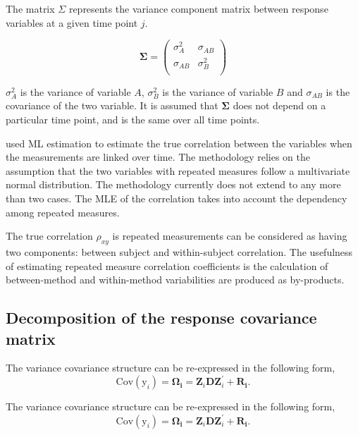 \documentclass[12pt, a4paper]{report}
\theoremstyle{plain}
\theoremstyle{definition}
\theoremstyle{remark}
\begin{document}
The matrix $\Sigma$ represents the variance component matrix between response variables at a given time point $j$.

\[
\boldsymbol{\Sigma} = \left( \begin{array}{cc}
\sigma^2_{A} & \sigma_{AB} \\
\sigma_{AB} & \sigma^2_{B}\\
\end{array}   \right)
\]

$\sigma^2_{A}$ is the variance of variable $A$, $\sigma^2_{B}$ is the variance of variable $B$ and $\sigma_{AB}$ is the covariance of the two variable. It is assumed that $\boldsymbol{\Sigma}$ does not depend on a particular time point, and is the same over all time points.

\citet{Lam} used ML estimation to estimate the true correlation between the variables when
the measurements are linked over time. The methodology relies on the assumption that the two variables with repeated measures follow a multivariate normal distribution. The methodology currently does not extend to any more than two cases. The MLE of the correlation takes into account the dependency among repeated measures.

The true correlation $\rho_{xy}$ is repeated measurements can be considered as having two components: between subject and within-subject correlation. The usefulness of estimating repeated measure correlation coefficients is the calculation of between-method and within-method variabilities are produced as by-products.


\newpage

\subsection{Decomposition of the response covariance matrix}
The variance covariance structure can be re-expressed in the following form,
\[
\mbox{Cov}(\mbox{y}_{i}) = \boldsymbol{\Omega_{i}} = \boldsymbol{Z}_{i}\boldsymbol{D}\boldsymbol{Z}_{i}^\prime + \boldsymbol{R_{i}}.
\]


The variance covariance structure can be re-expressed in the following form,
\[
\mbox{Cov}(\mbox{y}_{i}) = \boldsymbol{\Omega_{i}} = \boldsymbol{Z}_{i}\boldsymbol{D}\boldsymbol{Z}_{i}^\prime + \boldsymbol{R_{i}}.
\]
\end{document}

